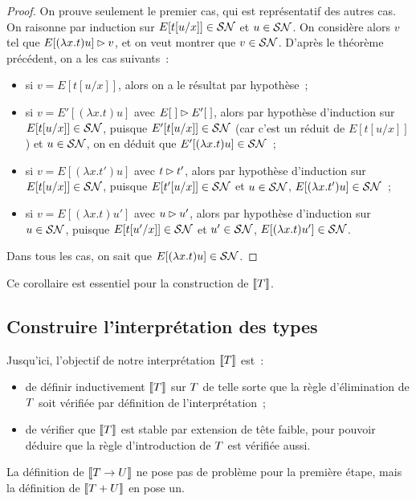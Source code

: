 \begin{proof}
  On prouve seulement le premier cas, qui est représentatif des autres cas.
  On raisonne par induction sur $E[t[u/x]]\in \mathcal{SN}$ et $u\in\mathcal{SN}$. On considère
  alors $v$ tel que $E[(\lambda x.t)u]\rhd v$, et on veut montrer que
  $v \in \mathcal{SN}$. D'après le théorème précédent, on a les cas suivants~:
  \begin{itemize}
  \item si $v = E[t[u/x]]$, alors on a le résultat par hypothèse~;
  \item si $v = E'[(\lambda x.t)u]$ avec $E[\;]\rhd E'[\;]$, alors
    par hypothèse d'induction sur $E[t[u/x]]\in\mathcal{SN}$, puisque
    $E'[t[u/x]] \in \mathcal{SN}$ (car c'est un réduit de $E[t[u/x]]$) et $u\in \mathcal{SN}$, on
    en déduit que $E'[(\lambda x.t)u]\in\mathcal{SN}$~;
  \item si $v = E[(\lambda x.t')u]$ avec $t \rhd t'$, alors
    par hypothèse d'induction sur $E[t[u/x]]\in\mathcal{SN}$, puisque
    $E[t'[u/x]]\in\mathcal{SN}$ et $u \in \mathcal{SN}$, $E[(\lambda x.t')u] \in \mathcal{SN}$~;
  \item si $v = E[(\lambda x.t)u']$ avec $u \rhd u'$, alors
    par hypothèse d'induction sur $u \in \mathcal{SN}$, puisque
    $E[t[u'/x]] \in \mathcal{SN}$ et $u'\in \mathcal{SN}$, $E[(\lambda x.t)u'] \in \mathcal{SN}$.
  \end{itemize}
  Dans tous les cas, on sait que $E[(\lambda x.t)u]\in \mathcal{SN}$.
\end{proof}

\noindent
Ce corollaire est essentiel pour la construction de $\llbracket T\rrbracket$.

\subsection{Construire l'interprétation des types}

Jusqu'ici, l'objectif de notre interprétation $\llbracket T\rrbracket$ est~:
\begin{itemize}
\item de définir inductivement $\llbracket T\rrbracket$ sur $T$ de telle
  sorte que la règle d'élimination de $T$ soit vérifiée par définition
  de l'interprétation~;
\item de vérifier que $\llbracket T\rrbracket$ est stable par extension de tête faible,
  pour pouvoir déduire que la règle d'introduction de $T$ est vérifiée
  aussi.
\end{itemize}
La définition de $\llbracket T\to U\rrbracket$ ne pose pas de problème pour la
première étape, mais la définition de $\llbracket T + U\rrbracket$ en pose un.

